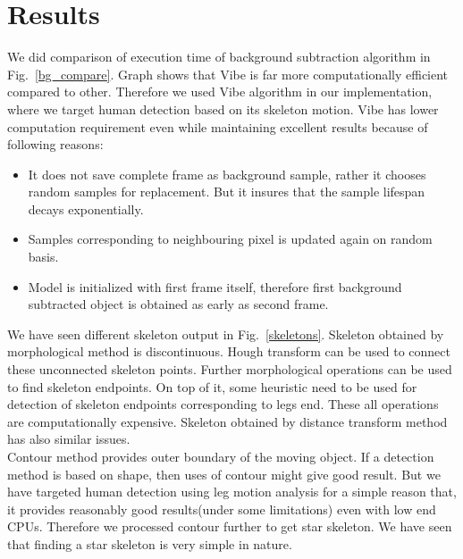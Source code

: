 \section{Results}
\indent We did comparison of execution time of background subtraction
algorithm in Fig.~\ref{bg_compare}. Graph shows that Vibe is far more
computationally efficient compared to other. Therefore we used Vibe
algorithm in our implementation, where we target human detection based
on its skeleton motion. Vibe has lower computation requirement even
while maintaining excellent results because of following reasons:
\begin{itemize}
 \item It does not save complete frame as background sample,
 rather it chooses random samples for replacement. But it
 insures that the sample lifespan decays exponentially.
 \item Samples corresponding to neighbouring pixel is updated
 again on random basis.
 \item Model is initialized with first frame itself, therefore first
 background subtracted object is obtained as early as
 second frame.
\end{itemize}
\indent We have seen different skeleton output in Fig.~\ref{skeletons}.
Skeleton obtained by morphological method is discontinuous. Hough
transform can be used to connect these unconnected skeleton points.
Further morphological operations can be used to find skeleton endpoints.
On top of it, some heuristic need to be used for detection of skeleton
endpoints corresponding to legs end. These all operations are
computationally expensive. Skeleton obtained by distance transform
method has also similar issues.\\
\indent Contour method provides outer boundary of the moving object. If
a detection method is based on shape, then uses of contour might give
good result. But we have targeted human detection using leg motion
analysis for a simple reason that, it provides reasonably good
results(under some limitations) even with low end CPUs. Therefore we
processed contour further to get star skeleton. We have seen that
finding a star skeleton is very simple in nature.
